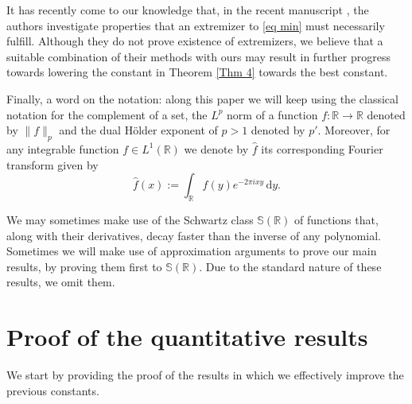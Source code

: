\documentclass[11pt, reqno]{amsart}
\newcommand{\dy}{\, \mathrm{d}y}
\numberwithin{equation}{section}
\newcommand{\R}{{\mathbb R}}
\begin{document}
It has recently come to our knowledge that, in the recent manuscript \cite{FKM}, the authors investigate properties that an extremizer to \eqref{eq min} must necessarily fulfill. Although they do not prove existence of extremizers, we believe that a suitable combination of their methods with ours may 
result in further progress towards lowering the constant in Theorem \ref{Thm 4} towards the best constant. 

Finally, a word on the notation: along this paper we will keep using the classical notation
for the complement of a set, the $L^p$ norm of a function $f:\R\to\R$ denoted by $\|f\|_p$ and the dual H\"older exponent of $p>1$ denoted by $p'$. Moreover,
for any  integrable function $f\in L^{1}(\R)$ we denote by $\widehat{f}$ its corresponding Fourier transform given by
$$
\widehat{f}(x):=\int_{\R}f(y)e^{-2\pi ixy}\dy.
$$


We may sometimes make use of the Schwartz class $\mathbb{S}(\R)$ of functions that, along with their derivatives, decay faster than the inverse of any polynomial. Sometimes we will make use of approximation arguments 
to prove our main results, by proving them first to $\mathbb{S}(\R).$ Due to the standard nature of these results, we omit them. 

\section{Proof of the quantitative results} 

We start by providing the proof of the results in which we effectively improve the previous constants. \\ 
\end{document}

